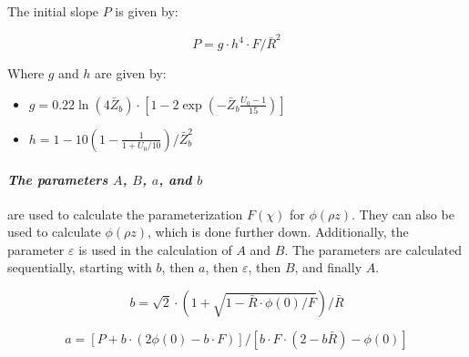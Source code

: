 The initial slope $P$ is given by:

\begin{equation}
    \label{eq:theory:quantitative:pap:slope_P}
    P = g \cdot h^4 \cdot F/\bar{R}^2
\end{equation}

Where $g$ and $h$ are given by:

\begin{itemize}
    \item $ g = 0.22 \ln(4 \bar{Z}_b) \cdot [1 - 2 \exp(-\bar{Z}_b \frac{U_0 - 1}{15})] $
    \item $ h = 1 - 10(1-\frac{1}{1+ U_0/10})/\bar{Z}_b^2 $
\end{itemize}











\paragraph{\emph{The parameters $A$, $B$, $a$, and $b$}} are used to calculate the parameterization $F(\chi)$ for $\phi(\rho z)$.
They can also be used to calculate $\phi(\rho z)$, which is done further down.
Additionally, the parameter $\varepsilon$ is used in the calculation of $A$ and $B$.
The parameters are calculated sequentially, starting with $b$, then $a$, then $\varepsilon$, then $B$, and finally $A$.


\begin{equation}
    \label{eq:theory:quantitative:pap:small_b}
    b = \sqrt{2} \cdot (1 + \sqrt{1 - \bar{R} \cdot \phi(0) / F})/\bar{R}
\end{equation}

\begin{equation}
    \label{eq:theory:quantitative:pap:small_a}
    a = [P + b \cdot (2\phi(0) - b \cdot F)] / [b \cdot F \cdot (2 - b \bar{R}) - \phi(0)]
\end{equation}

